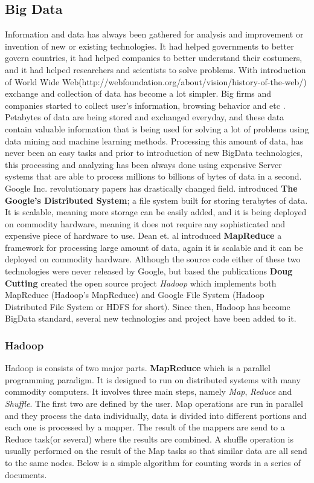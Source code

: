 \documentclass[english]{tktltiki}
\begin{document}
\subsection{Big Data}
Information and data has always been gathered for analysis and improvement or invention of new or existing technologies. It had helped governments to better govern countries, it had helped companies to better understand their costumers, and it had helped researchers and scientists to solve problems. With introduction of World Wide Web(http://webfoundation.org/about/vision/history-of-the-web/) exchange and collection of data has become a lot simpler. Big firms and companies started to collect user's information, browsing behavior and etc . Petabytes of data are being stored and exchanged everyday, and these data contain valuable information that is being used for solving a lot of problems using data mining and machine learning methods. 
Processing this amount of data, has never been an easy tasks and prior to introduction of new BigData technologies, this processing and analyzing has been always done using expensive Server systems that are able to process millions to billions of bytes of data in a second. 
Google Inc. revolutionary papers has drastically changed field. \cite{ghemawat03} introduced \textbf{The Google's Distributed System}; a file system built for storing terabytes of data. It is scalable, meaning more storage can be easily added, and it is being deployed on commodity hardware, meaning it does not require any sophisticated and expensive piece of hardware to use. Dean et. al \cite{dean04} introduced \textbf{MapReduce} a framework for processing large amount of data, again it is scalable and it can be deployed on commodity hardware. 
Although the source code either of these two technologies were never released by Google, but based the publications \textbf{Doug Cutting} created the open source project \textit{Hadoop} which implements both MapReduce (Hadoop's MapReduce) and Google File System (Hadoop Distributed File System or HDFS for short). Since then, Hadoop has become BigData standard, several new technologies and project have been added to it.

\subsubsection{Hadoop}
Hadoop is consists of two major parts. 
\textbf{MapReduce} which is a parallel programming paradigm. It is designed to run on distributed systems with many commodity computers. It involves three main steps, namely \textit{Map}, \textit{Reduce} and \textit{Shuffle}. The first two are defined by the user. Map operations are run in parallel and they process the data individually, data is divided into different portions and each one is processed by a mapper. The result of the mappers are send to a Reduce task(or several) where the results are combined. A shuffle operation is usually performed on the result of the Map tasks so that similar data are all send to the same nodes. Below is a simple algorithm for counting words in a series of documents. 
\end{document}
